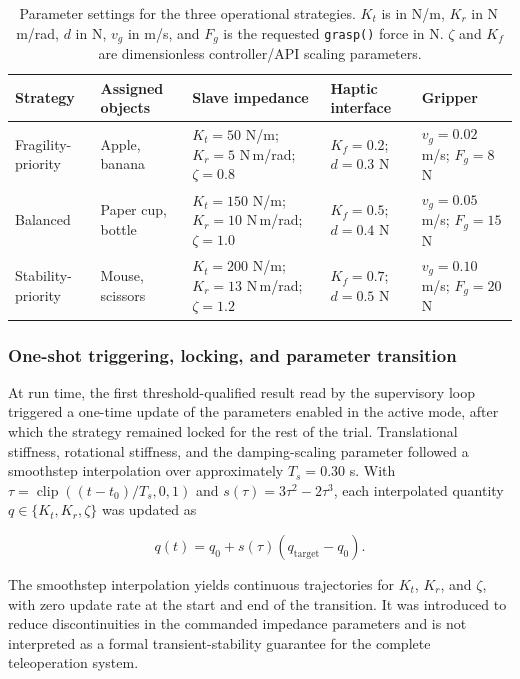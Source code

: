\begin{table}[!t]
\centering
\caption{Parameter settings for the three operational strategies. $K_t$ is in N/m, $K_r$ in N\,m/rad, $d$ in N, $v_g$ in m/s, and $F_g$ is the requested \texttt{grasp()} force in N. $\zeta$ and $K_f$ are dimensionless controller/API scaling parameters.}
\label{tab:2}
\small
\setlength{\tabcolsep}{6pt}
\renewcommand{\arraystretch}{1.16}
\begin{tabularx}{\textwidth}{@{}p{}p{}YYY@{}}
\toprule
Strategy & Assigned objects & Slave impedance & Haptic interface & Gripper \\
\midrule
Fragility-priority & Apple, banana & $K_t=50$ N/m; $K_r=5$ N\,m/rad; $\zeta=0.8$ & $K_f=0.2$; $d=0.3$ N & $v_g=0.02$ m/s; $F_g=8$ N \\
Balanced & Paper cup, bottle & $K_t=150$ N/m; $K_r=10$ N\,m/rad; $\zeta=1.0$ & $K_f=0.5$; $d=0.4$ N & $v_g=0.05$ m/s; $F_g=15$ N \\
Stability-priority & Mouse, scissors & $K_t=200$ N/m; $K_r=13$ N\,m/rad; $\zeta=1.2$ & $K_f=0.7$; $d=0.5$ N & $v_g=0.10$ m/s; $F_g=20$ N \\
\bottomrule
\end{tabularx}
\end{table}
\subsubsection{One-shot triggering, locking, and parameter transition}
At run time, the first threshold-qualified result read by the supervisory loop triggered a one-time update of the parameters enabled in the active mode, after which the strategy remained locked for the rest of the trial. Translational stiffness, rotational stiffness, and the damping-scaling parameter followed a smoothstep interpolation over approximately $T_s=0.30$ s. With $\tau=\operatorname{clip}((t-t_0)/T_s,0,1)$ and $s(\tau)=3\tau^2-2\tau^3$, each interpolated quantity $q\in\{K_t,K_r,\zeta\}$ was updated as

\begin{equation}
\label{eq:smoothstep-update}
q(t)=q_0+s(\tau)(q_\mathrm{target}-q_0).
\end{equation}

The smoothstep interpolation yields continuous trajectories for $K_t$, $K_r$, and $\zeta$, with zero update rate at the start and end of the transition. It was introduced to reduce discontinuities in the commanded impedance parameters and is not interpreted as a formal transient-stability guarantee for the complete teleoperation system.

